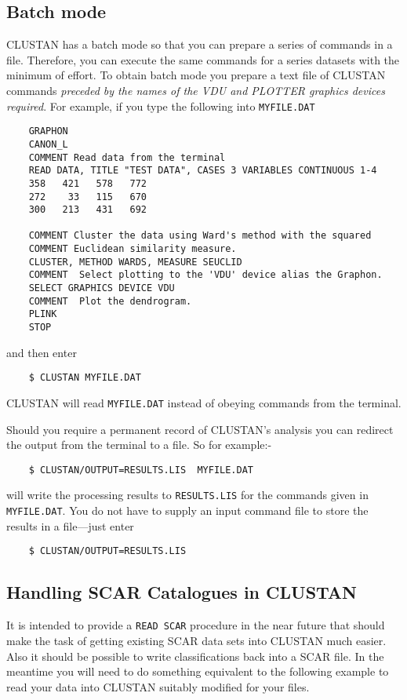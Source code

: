 \subsection{Batch mode}
{\small CLUSTAN} has a batch mode so that you can prepare a series of commands
in a file.  Therefore, you can execute the same commands for a series
datasets with the minimum of effort.  To obtain batch mode you prepare
a text file of {\small CLUSTAN} commands {\em preceded by the names of the
VDU and PLOTTER graphics devices required}.  For example, if you type the 
following into {\tt MYFILE.DAT}
\begin{verbatim}
    GRAPHON
    CANON_L
    COMMENT Read data from the terminal
    READ DATA, TITLE "TEST DATA", CASES 3 VARIABLES CONTINUOUS 1-4
    358   421   578   772
    272    33   115   670
    300   213   431   692

    COMMENT Cluster the data using Ward's method with the squared 
    COMMENT Euclidean similarity measure.
    CLUSTER, METHOD WARDS, MEASURE SEUCLID
    COMMENT  Select plotting to the 'VDU' device alias the Graphon.
    SELECT GRAPHICS DEVICE VDU
    COMMENT  Plot the dendrogram.  
    PLINK
    STOP
\end{verbatim}
and then enter
\begin{verbatim}
    $ CLUSTAN MYFILE.DAT
\end{verbatim}
{\small CLUSTAN} will read {\tt MYFILE.DAT} instead of obeying commands from the
terminal.

Should you require a permanent record of {\small CLUSTAN}'s analysis you can 
redirect the output from the terminal to a file.  So for example:-
\begin{verbatim}
    $ CLUSTAN/OUTPUT=RESULTS.LIS  MYFILE.DAT
\end{verbatim}
will write the processing results to {\tt RESULTS.LIS} for the commands
given in {\tt MYFILE.DAT}.  You do not have to supply an input command
file to store the results in a file---just enter
\begin{verbatim}
    $ CLUSTAN/OUTPUT=RESULTS.LIS
\end{verbatim}
\subsection{Handling SCAR Catalogues in CLUSTAN}
It is intended to provide a {\tt READ SCAR} procedure in the near future
that should make the task of getting existing SCAR data sets into
{\small CLUSTAN} much easier.  Also it should be possible to write
classifications back into a SCAR file. In the meantime you will need to
do something equivalent to the following example to read your data into
{\small CLUSTAN} suitably modified for your files.

